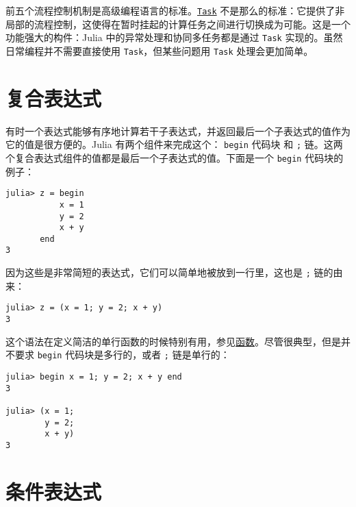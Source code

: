 前五个流程控制机制是高级编程语言的标准。\hyperlink{7131243650304654155}{\texttt{Task}} 不是那么的标准：它提供了非局部的流程控制，这使得在暂时挂起的计算任务之间进行切换成为可能。这是一个功能强大的构件：Julia 中的异常处理和协同多任务都是通过 \texttt{Task} 实现的。虽然日常编程并不需要直接使用 \texttt{Task}，但某些问题用 \texttt{Task} 处理会更加简单。



\hypertarget{16096814372489430927}{}


\section{复合表达式}



有时一个表达式能够有序地计算若干子表达式，并返回最后一个子表达式的值作为它的值是很方便的。Julia 有两个组件来完成这个： \texttt{begin} 代码块 和 \texttt{;} 链。这两个复合表达式组件的值都是最后一个子表达式的值。下面是一个 \texttt{begin} 代码块的例子：




\begin{verbatim}
julia> z = begin
           x = 1
           y = 2
           x + y
       end
3
\end{verbatim}



因为这些是非常简短的表达式，它们可以简单地被放到一行里，这也是 \texttt{;} 链的由来：




\begin{verbatim}
julia> z = (x = 1; y = 2; x + y)
3
\end{verbatim}



这个语法在定义简洁的单行函数的时候特别有用，参见\href{@id man-functions}{函数}。尽管很典型，但是并不要求 \texttt{begin} 代码块是多行的，或者 \texttt{;} 链是单行的：




\begin{verbatim}
julia> begin x = 1; y = 2; x + y end
3

julia> (x = 1;
        y = 2;
        x + y)
3
\end{verbatim}



\hypertarget{9876835618453764646}{}


\section{条件表达式}



